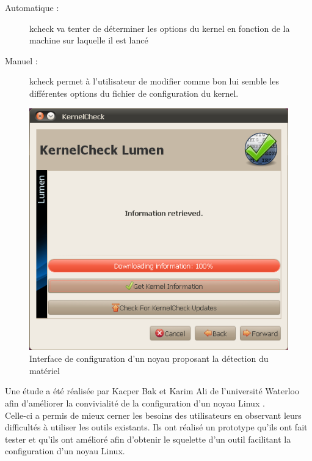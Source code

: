 \documentclass[16pts]{report}
\begin{document}
\begin{description}
    \begin{description}
        \item[Automatique :] kcheck va tenter de déterminer les options du kernel
            en fonction de la machine sur laquelle il est lancé
        \item[Manuel :] kcheck permet à l’utilisateur de modifier comme bon lui
            semble les différentes options du fichier de configuration du kernel.
    \end{description}
        \begin{figure}[H]
            \includegraphics[scale=0.8]{illustrations/kernel_check.png}
            \centering
            \caption{Interface de configuration d'un noyau proposant la détection du matériel}
            \label{fig:KernelCheck}
        \end{figure}
\end{description}

Une étude a été réalisée par Kacper Bak et Karim Ali de l’université Waterloo
afin d’améliorer la convivialité de la configuration d’un noyau Linux
\cite{Waterloo:Etude}.
\\

Celle-ci a permis de mieux cerner les besoins des utilisateurs en observant
leurs difficultés à utiliser les outils existants. Ils ont réalisé un prototype
qu’ils ont fait tester et qu’ils ont amélioré afin d’obtenir le squelette d’un
outil facilitant la configuration d’un noyau Linux. \\
\\
\end{document}
